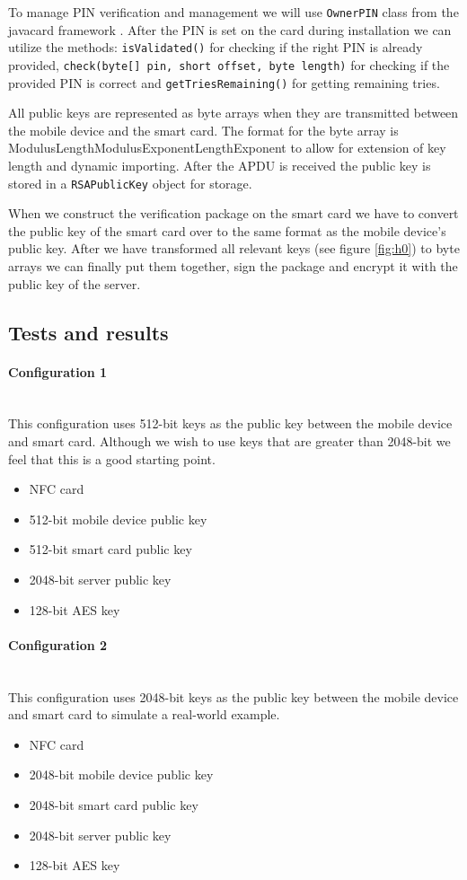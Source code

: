 To manage PIN verification and management we will use \texttt{OwnerPIN} class from the javacard framework \cite{ownerpin}. After the PIN is set on the card during installation we can utilize the methods: \texttt{isValidated()} for checking if the right PIN is already provided, \texttt{check(byte[] pin, short offset, byte length)} for checking if the provided PIN is correct and \texttt{getTriesRemaining()} for getting remaining tries.

All public keys are represented as byte arrays when they are transmitted between the mobile device and the smart card. The format for the byte array is \textbar{}ModulusLength\textbar{}Modulus\textbar{}ExponentLength\textbar{}Exponent\textbar{} to allow for extension of key length and dynamic importing. After the APDU is received the public key is stored in a \texttt{RSAPublicKey} object for storage.

When we construct the verification package on the smart card we have to convert the public key of the smart card over to the same format as the mobile device's public key. After we have transformed all relevant keys (see figure \ref{fig:h0}) to byte arrays we can finally put them together, sign the package and encrypt it with the public key of the server.

\subsection{Tests and results}
\paragraph{Configuration 1}\mbox{}\\
This configuration uses 512-bit keys as the public key between the mobile device and smart card. Although we wish to use keys that are greater than 2048-bit we feel that this is a good starting point.
\begin{itemize}
    \item NFC card
    \item 512-bit mobile device public key
    \item 512-bit smart card public key
    \item 2048-bit server public key
    \item 128-bit AES key
\end{itemize}

\paragraph{Configuration 2}\mbox{}\\
This configuration uses 2048-bit keys as the public key between the mobile device and smart card to simulate a real-world example.
\begin{itemize}
    \item NFC card
    \item 2048-bit mobile device public key
    \item 2048-bit smart card public key
    \item 2048-bit server public key
    \item 128-bit AES key
\end{itemize}

